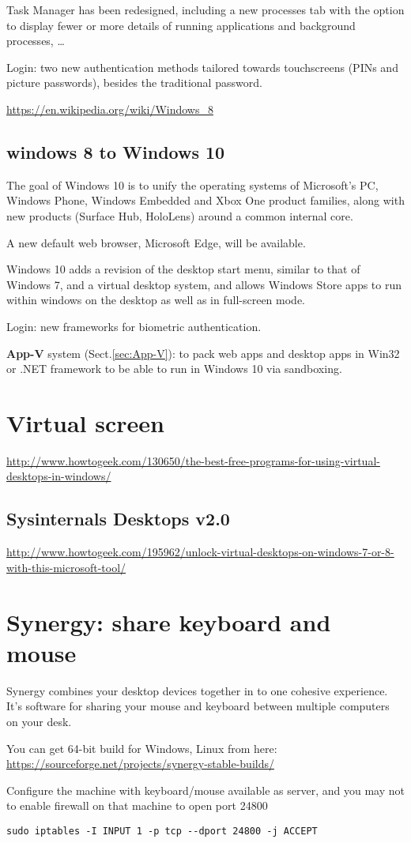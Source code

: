 Task Manager has been redesigned, including a new processes tab with the option
to display fewer or more details of running applications and background
processes, \ldots

Login: two new authentication methods tailored towards touchscreens (PINs and
picture passwords), besides the traditional password.

\url{https://en.wikipedia.org/wiki/Windows_8}

\subsection{windows 8 to Windows 10}

The goal of Windows 10 is to unify the operating systems of Microsoft's PC,
Windows Phone, Windows Embedded and Xbox One product families, along with new
products (Surface Hub, HoloLens) around a common internal core.

A new default web browser, Microsoft Edge, will be available.

Windows 10 adds a revision of the desktop start menu, similar to that of Windows
7, and a virtual desktop system, and allows Windows Store apps to run within
windows on the desktop as well as in full-screen mode.

Login: new frameworks for biometric authentication.

{\bf App-V} system (Sect.\ref{sec:App-V}): to pack web apps and desktop apps in
Win32 or .NET framework to be able to run in Windows 10 via sandboxing.

\section{Virtual screen}
\label{sec:virtual-screen}

\url{http://www.howtogeek.com/130650/the-best-free-programs-for-using-virtual-desktops-in-windows/}


\subsection{Sysinternals Desktops v2.0 }

\url{http://www.howtogeek.com/195962/unlock-virtual-desktops-on-windows-7-or-8-with-this-microsoft-tool/}
\section{Synergy: share keyboard and mouse}
\label{sec:synergy}

Synergy combines your desktop devices together in to one cohesive experience.
It's software for sharing your mouse and keyboard between multiple computers on
your desk. 

You can get 64-bit build for Windows, Linux from here:
\url{https://sourceforge.net/projects/synergy-stable-builds/}


Configure the machine with keyboard/mouse available as server, and you may not
to enable firewall on that machine to open port 24800
\begin{verbatim}
sudo iptables -I INPUT 1 -p tcp --dport 24800 -j ACCEPT
\end{verbatim}

